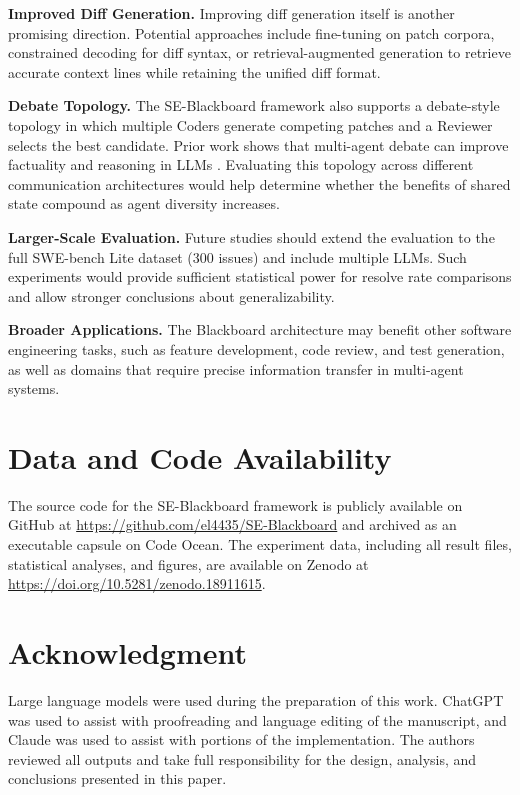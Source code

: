 \documentclass{ieeeaccess}
\begin{document}
\textbf{Improved Diff Generation.} Improving diff generation itself is another promising direction. Potential approaches include fine-tuning on patch corpora, constrained decoding for diff syntax, or retrieval-augmented generation \cite{lewis2020retrieval} to retrieve accurate context lines while retaining the unified diff format.

\textbf{Debate Topology.} The SE-Blackboard framework also supports a debate-style topology in which multiple Coders generate competing patches and a Reviewer selects the best candidate. Prior work shows that multi-agent debate can improve factuality and reasoning in LLMs \cite{du2024improving}. Evaluating this topology across different communication architectures would help determine whether the benefits of shared state compound as agent diversity increases.

\textbf{Larger-Scale Evaluation.} Future studies should extend the evaluation to the full SWE-bench Lite dataset (300 issues) and include multiple LLMs. Such experiments would provide sufficient statistical power for resolve rate comparisons and allow stronger conclusions about generalizability.

\textbf{Broader Applications.} The Blackboard architecture may benefit other software engineering tasks, such as feature development, code review, and test generation, as well as domains that require precise information transfer in multi-agent systems.

\section*{Data and Code Availability}

The source code for the SE-Blackboard framework is publicly available on GitHub at \url{https://github.com/el4435/SE-Blackboard} and archived as an executable capsule on Code Ocean. The experiment data, including all result files, statistical analyses, and figures, are available on Zenodo at \url{https://doi.org/10.5281/zenodo.18911615}.

\section*{Acknowledgment}

Large language models were used during the preparation of this work. ChatGPT was used to assist with proofreading and language editing of the manuscript, and Claude was used to assist with portions of the implementation. The authors reviewed all outputs and take full responsibility for the design, analysis, and conclusions presented in this paper.
\end{document}
